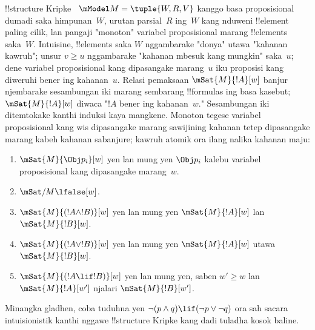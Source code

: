 \documentclass[../../../include/open-logic-section]{subfiles}
\begin{document}
!!{structure} Kripke
~$\mModel M = \tuple{W, R, V}$
kanggo basa proposisional
dumadi saka himpunan~$W$,
urutan parsial~$R$
ing~$W$ kang nduweni
!!{element} paling cilik,
lan pangaji "monoton"
variabel proposisional
marang !!{element}s
saka~$W$. Intuisine,
!!{element}s saka $W$
nggambarake "donya"
utawa "kahanan
kawruh"; unsur
$v \geq u$ nggambarake
"kahanan mbesuk kang
mungkin" saka~$u$;
dene variabel
proposisional kang
dipasangake marang~$u$
iku proposisi kang
diweruhi bener
ing kahanan~$u$.
Relasi pemaksaan
$\mSat{M}{!A}[w]$
banjur njembarake
sesambungan iki
marang sembarang
!!{formula}s ing
basa kasebut;
$\mSat{M}{!A}[w]$
diwaca "$!A$ bener
ing kahanan~$w$."
Sesambungan iki
ditemtokake kanthi
induksi kaya mangkene. Monoton tegese variabel proposisional kang wis dipasangake marang sawijining kahanan tetep dipasangake marang kabeh kahanan sabanjure; kawruh atomik ora ilang nalika kahanan maju:
\begin{enumerate}
\item $\mSat{M}{\Obj p_i}[w]$ yen lan mung yen
  $\Obj p_i$ kalebu variabel proposisional
  kang dipasangake marang~$w$.
\item $\mSat/{M}{\lfalse}[w]$.
\item $\mSat{M}{(!A \land !B)}[w]$ yen lan mung yen
  $\mSat{M}{!A}[w]$ lan $\mSat{M}{!B}[w]$.
\item $\mSat{M}{(!A \lor !B)}[w]$ yen lan mung yen
  $\mSat{M}{!A}[w]$ utawa $\mSat{M}{!B}[w]$.
\item $\mSat{M}{(!A \lif !B)}[w]$ yen lan mung yen,
  saben $w' \geq w$ lan
  $\mSat{M}{!A}[w']$ njalari
  $\mSat{M}{!B}[w']$.
\end{enumerate}
Minangka gladhen, coba
tuduhna yen $\lnot (p \land q) \lif
(\lnot p \lor \lnot q)$
ora sah sacara intuisionistik
kanthi nggawe
!!{structure} Kripke
kang dadi tuladha
kosok baline.
\end{document}
